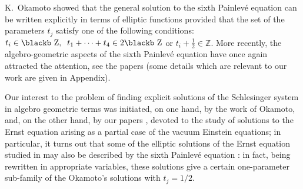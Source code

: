 \documentclass[11pt]{article}
\def\Bbb#1{\hbox{\blackb #1}}
\def\Z{\mathbb{Z}}
\def\f{\frac}
\begin{document}
K.~Okamoto showed \cite{O} that
the general solution to the sixth Painlev\'e equation  can be written 
explicitly in terms of elliptic functions provided that the set of
the parameters $t_j$ satisfy one of the following conditions:
$t_i\in\Bbb Z,\;\;t_1+\dots+t_4\in 2\Bbb Z$ or $t_i+\f12\in \Z$.
More recently, the algebro-geometric aspects of the sixth Painlev\'e 
equation have once again attracted the attention, see the papers \cite{H,M} 
(some details which are relevant to our work are given in Appendix).  


Our interest to the problem  of finding explicit solutions of the Schlesinger 
system in algebro geometric terms 
was initiated, on one hand, by the work of Okamoto,
and, on the other hand, by our papers \cite{Kor,KorMat,Kor1,K}, 
devoted to the study of 
solutions to the Ernst equation arising as a partial case 
of the vacuum Einstein equations; in particular, it turns out that
some of the elliptic solutions of the Ernst equation studied in \cite{Kor1} 
may also be described by the sixth Painlev\'e equation \cite{K}: 
in fact, being rewritten 
in appropriate variables, these solutions give a
certain one-parameter sub-family of the Okamoto's solutions with $t_j=1/2$.
\end{document}

